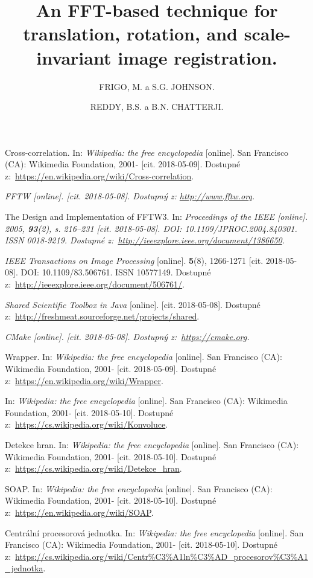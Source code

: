\documentclass[a4paper,12pt]{article}
\begin{document}
{  Cross-correlation. In: \textit{Wikipedia: the free encyclopedia} [online]. San Francisco (CA): Wikimedia Foundation, 2001- [cit. 2018-05-09]. Dostupné z:~\url{https://en.wikipedia.org/wiki/Cross-correlation}.
  
  \it{FFTW} [online]. [cit. 2018-05-08]. Dostupný z: \url{http://www.fftw.org}.
  
   \author{FRIGO, M. a S.G. JOHNSON.} The Design and Implementation of FFTW3. In: \it{Proceedings of the IEEE} [online]. 2005, \textbf{93}(2), s. 216--231 [cit. 2018-05-08]. DOI: 10.1109/JPROC.2004.840301. ISSN 0018-9219. Dostupné z:~\url{http://ieeexplore.ieee.org/document/1386650}.
  
   \author{REDDY, B.S. a B.N. CHATTERJI.} \title{An FFT-based technique for translation, rotation, and scale-invariant image registration.} \textit{IEEE Transactions on Image Processing} [online]. \textbf{5}(8), 1266-1271 [cit. 2018-05-08]. DOI: 10.1109/83.506761. ISSN 10577149. Dostupné z:~\url{http://ieeexplore.ieee.org/document/506761/}.
  
  \textit{Shared Scientific Toolbox in Java} [online]. [cit. 2018-05-08]. Dostupné z:~\url{http://freshmeat.sourceforge.net/projects/shared}.
    
  \it{CMake} [online]. [cit. 2018-05-08]. Dostupný z:~\url{https://cmake.org}.
  
  Wrapper. In: \textit{Wikipedia: the free encyclopedia} [online]. San Francisco (CA): Wikimedia Foundation, 2001- [cit. 2018-05-09]. Dostupné z:~\url{https://en.wikipedia.org/wiki/Wrapper}.
  
  In: \textit{Wikipedia: the free encyclopedia} [online]. San Francisco (CA): Wikimedia Foundation, 2001- [cit. 2018-05-10]. Dostupné z:~\url{https://cs.wikipedia.org/wiki/Konvoluce}.
  
  Detekce hran. In: \textit{Wikipedia: the free encyclopedia} [online]. San Francisco (CA): Wikimedia Foundation, 2001- [cit. 2018-05-10]. Dostupné z:~\url{https://cs.wikipedia.org/wiki/Detekce_hran}.
  
  SOAP. In: \textit{Wikipedia: the free encyclopedia} [online]. San Francisco (CA): Wikimedia Foundation, 2001- [cit. 2018-05-10]. Dostupné z:~\url{https://en.wikipedia.org/wiki/SOAP}.
  
  Centrální procesorová jednotka. In: \textit{Wikipedia: the free encyclopedia} [online]. San Francisco (CA): Wikimedia Foundation, 2001- [cit. 2018-05-10]. Dostupné z:~\url{https://cs.wikipedia.org/wiki/Centr\%C3\%A1ln\%C3\%AD_procesorov\%C3\%A1_jednotka}.
  
}
\end{document}

